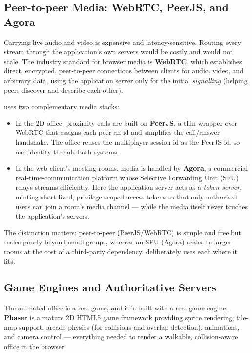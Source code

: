 \subsection{Peer-to-peer Media: WebRTC, PeerJS, and Agora}

Carrying live audio and video is expensive and latency-sensitive. Routing every
stream through the application's own servers would be costly and would not scale.
The industry standard for browser media is \textbf{WebRTC}, which establishes
direct, encrypted, peer-to-peer connections between clients for audio, video,
and arbitrary data, using the application server only for the initial
\emph{signalling} (helping peers discover and describe each other).

\voname{} uses two complementary media stacks:

\begin{itemize}
  \item In the 2D office, proximity calls are built on \textbf{PeerJS}, a thin
  wrapper over WebRTC that assigns each peer an id and simplifies the
  call/answer handshake. The office reuses the multiplayer session id as the
  PeerJS id, so one identity threads both systems.

  \item In the web client's meeting rooms, media is handled by \textbf{Agora}, a
  commercial real-time-communication platform whose Selective Forwarding Unit
  (SFU) relays streams efficiently. Here the application server acts as a
  \emph{token server}, minting short-lived, privilege-scoped access tokens so
  that only authorised users can join a room's media channel --- while the media
  itself never touches the application's servers.
\end{itemize}

The distinction matters: peer-to-peer (PeerJS/WebRTC) is simple and free but
scales poorly beyond small groups, whereas an SFU (Agora) scales to larger rooms
at the cost of a third-party dependency. \voname{} deliberately uses each where
it fits.

\subsection{Game Engines and Authoritative Servers}

The animated office is a real game, and it is built with a real game engine.
\textbf{Phaser} is a mature 2D HTML5 game framework providing sprite rendering,
tile-map support, arcade physics (for collisions and overlap detection),
animations, and camera control --- everything needed to render a walkable,
collision-aware office in the browser.

